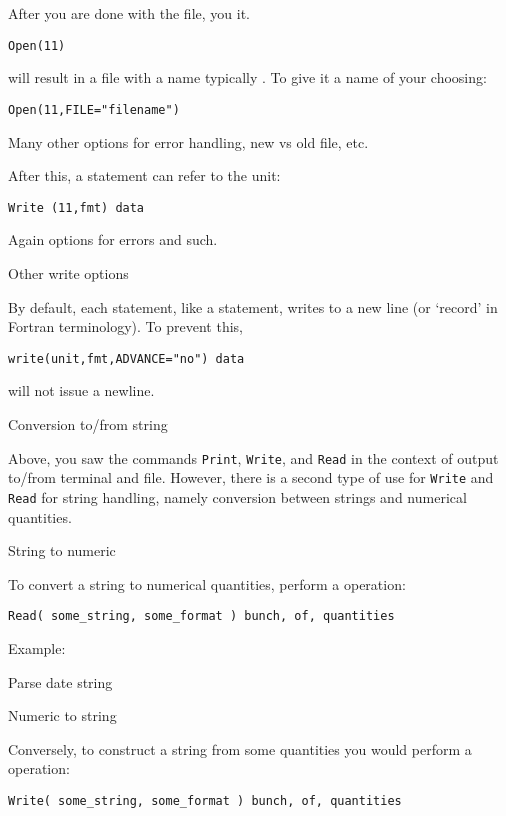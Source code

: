 After you are done with the file, you  it.

\begin{lstlisting}
Open(11)
\end{lstlisting}
will result in a file with a name typically .
To give it a name of your choosing:
\begin{lstlisting}
Open(11,FILE="filename")
\end{lstlisting}
Many other options for error handling, new vs old file, etc.

After this, a  statement can refer to the unit:
\begin{lstlisting}
Write (11,fmt) data
\end{lstlisting}
Again options for errors and such.

 {Other write options}

By default, each  statement,
like a  statement,
writes to a new line (or `record' in Fortran terminology).
To prevent this,
\begin{lstlisting}
write(unit,fmt,ADVANCE="no") data
\end{lstlisting}
will not issue a newline.

 {Conversion to/from string}
\label{sec:string-conversion}

Above, you saw
the commands \lstinline{Print}, \lstinline{Write},
and \lstinline{Read} in the context of output to/from
terminal and file. However, there is a second type of use
for \lstinline{Write} and \lstinline{Read} for string handling,
namely conversion between strings and numerical quantities.

 {String to numeric}

To convert a string to numerical quantities,
  perform a  operation:
\begin{lstlisting}
Read( some_string, some_format ) bunch, of, quantities
\end{lstlisting}
Example:
\begin{block}{Parse date string}
  \label{sl:f-date-string}
\end{block}

 {Numeric to string}

Conversely, to construct a string from some quantities
  you would perform a  operation:
\begin{lstlisting}
Write( some_string, some_format ) bunch, of, quantities
\end{lstlisting}

